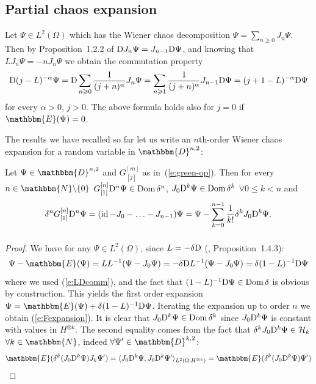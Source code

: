 \begin{appendices}
\subsection{Partial chaos expansion}

Let $\Psi \in L^2 (\Omega)$ which has the Wiener chaos decomposition $\Psi =
\sum_{n \geqslant 0} J_n \Psi$. Then by Proposition~1.2.2 of
{\cite{nualart_2006}} $\mathrm{D} J_n \Psi = J_{n - 1} \mathrm{D} \Psi$, and knowing
that $LJ_n \Psi = - nJ_n \Psi$ we obtain the commutation property
\begin{equation}
  \mathrm{D} (j - L)^{- \alpha} \Psi = \mathrm{D} \sum_{n \geqslant 0} \frac{1}{(j +
  n)^{\alpha}} J_n \Psi = \sum_{n \geqslant 1} \frac{1}{(j + n)^{\alpha}} J_{n
  - 1} \mathrm{D} \Psi = (j + 1 - L)^{- \alpha} \mathrm{D} \Psi \label{e:LDcomm}
\end{equation}
for every $\alpha > 0$, $j > 0$. The above formula holds also for $j = 0$ if
$\mathbbm{E} (\Psi) = 0$.

The results we have recalled so far let us write an $n$th-order Wiener chaos
expansion for a random variable in $\mathbbm{D}^{n, 2}$:

\begin{lemma}
  \label{l:Fexpansion}Let $\Psi \in \mathbbm{D}^{n, 2}$ and $G_{[j]}^{[m]}$ as
  in~(\ref{e:green-op}). Then for every $n \in \mathbbm{N}\backslash \{ 0 \}$
  $G_{[1]}^{[n]} \mathrm{D}^n \Psi \in \operatorname{Dom} \delta^n$, $J_0 \mathrm{D}^k \Psi
  \in \operatorname{Dom} \delta^k$ $\forall 0 \leqslant k < n$ and
  \begin{equation}
    \delta^n G_{[1]}^{[n]} \mathrm{D}^n \Psi = (\operatorname{id} - J_0 - \ldots - J_{n -
    1}) \Psi = \Psi - \sum_{k = 0}^{n - 1} \frac{1}{k!} \delta^k J_0 \mathrm{D}^k
    \Psi . \label{e:Fexpansion}
  \end{equation}
  \[ \  \]
\end{lemma}

\begin{proof}
  We have for any $\Psi \in L^2 (\Omega)$, since $L = - \delta \mathrm{D}$
  ({\cite{nualart_2006}}, Proposition~1.4.3):
  \[ \Psi -\mathbbm{E} (\Psi) = L L^{- 1} (\Psi - J_0 \Psi) = - \delta \mathD
     L^{- 1} (\Psi - J_0 \Psi) = \delta (1 - L)^{- 1} \mathD \Psi \]
  where we used (\ref{e:LDcomm}), and the fact that $(1 - L)^{- 1} \mathrm{D} \Psi
  \in \operatorname{Dom} \delta$ is obvious by construction. This yields the first
  order expansion $\Psi =\mathbbm{E} (\Psi) + \delta (1 - L)^{- 1} \mathD
  \Psi$. Iterating the expansion up to order $n$ we obtain
  (\ref{e:Fexpansion}). It is clear that $J_0 \mathrm{D}^k \Psi \in \operatorname{Dom}
  \delta^k$ since $J_0 \mathrm{D}^k \Psi$ is constant with values in $H^{\otimes
  k}$. The second equality comes from the fact that $\delta^k J_0 \mathrm{D}^k
  \Psi \in \mathcal{H}_k$ $\forall k \in \mathbbm{N}$, indeed $\forall \Psi'
  \in \mathbbm{D}^{k, 2}$:
  \[ \mathbbm{E} (\delta^k (J_0 \mathD^k \Psi) J_k \Psi') = \langle J_0
     \mathD^k \Psi, J_0 \mathD^k \Psi' \rangle_{L^2 (\Omega ; H^{\otimes k})}
     =\mathbbm{E} (\delta^k (J_0 \mathD^k \Psi) \Psi') \]
\end{proof}


\end{appendices}
